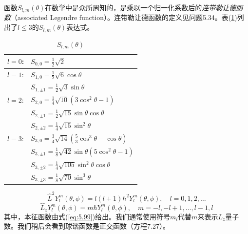     函数$S_{l,m}\left(\theta\right)$在数学中是众所周知的，是乘以一个归一化系数后的\textit{连带勒让德函数}（associated Legendre function）。连带勒让德函数的定义见问题5.34。表(\ref{tab:5.1})列出了$l \le 3$的$S_{l,m}\left(\theta\right)$表达式。
    \begin{table}[htbp]
        \centering
        \caption{$S_{l,m}\left(\theta\right)$}
        \label{tab:5.1}
        \begin{tabular}{|l|l|}
            \hline
            $l=0$: & $S_{0,0} = \frac{1}{2}\sqrt{2}$ \\
            \hline
            $l=1$: & $S_{1,0} = \frac{1}{2}\sqrt{6}\cos\theta$ \\
            & $S_{1,\pm 1} = \frac{1}{2}\sqrt{3}\sin\theta$ \\
            \hline
            $l=2$: & $S_{2,0} = \frac{1}{4}\sqrt{10}\left(3\cos^2\theta - 1\right)$ \\
            & $S_{2,\pm 1} = \frac{1}{2}\sqrt{15}\sin\theta\cos\theta$ \\
            & $S_{2,\pm 2} = \frac{1}{4}\sqrt{15}\sin^2\theta$ \\
            \hline
            $l=3$: & $S_{3,0} = \frac{3}{4}\sqrt{14}\left(\frac{5}{3}\cos^3\theta-\cos\theta\right)$ \\
            & $S_{3, \pm 1} = \frac{1}{8}\sqrt{42}\sin\theta\left(5\cos^2\theta - 1\right)$ \\
            & $S_{3, \pm 2} = \frac{1}{4}\sqrt{105}\sin^2\theta\cos\theta$ \\
            & $S_{3, \pm 3} = \frac{1}{8}\sqrt{70}\sin^3\theta$ \\
            \hline
        \end{tabular}
    \end{table}
    \begin{equation}
        \boxed{
            \hat{L}^2Y^m_l\left(\theta,\phi\right) = l\left(l+1\right)\hbar^2Y^m_l\left(\theta,\phi\right), \quad l = 0, 1, 2, \ldots
        }
        \label{eq:5.104}
    \end{equation}
    \begin{equation}
        \boxed{
            \hat{L}_zY^m_l\left(\theta,\phi\right) = m\hbar Y^m_l\left(\theta,\phi\right), \quad m = -l, -l+1, \ldots, l-1, l
        }
        \label{eq:5.105}
    \end{equation}
    其中，本征函数由式(\ref{eq:5.99})给出。我们通常使用符号$m_l$代替$m$来表示$L_z$量子数。我们稍后会看到球谐函数是正交函数（方程7.27）。

